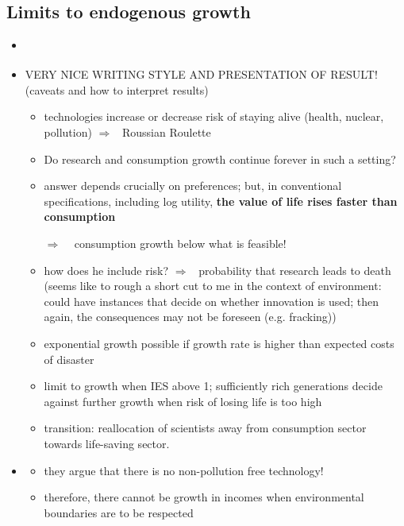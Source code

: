 \documentclass[12pt]{article}
\newcommand{\ar}{$\Rightarrow$ \ }
\begin{document}
\subsection{Limits to endogenous growth}
\begin{itemize}
\item \cite{Stokey1998AreGrowth}
\item \cite{Jones2016LifeGrowth} VERY NICE WRITING STYLE AND PRESENTATION OF RESULT! (caveats and how to interpret results)
\begin{itemize}
\item technologies increase or decrease risk of staying alive (health, nuclear, pollution) \ar Roussian Roulette
\item Do research and consumption growth continue forever in such a setting? 
\item answer depends crucially on preferences; but, in conventional specifications, including log utility, \textbf{the value of life rises faster than consumption}
\item[\ar] consumption growth below what is feasible! 
\item how does he include risk? \ar probability that research leads to death (seems like to rough a short cut to me in the context of environment: could have instances that decide on whether innovation is used; then again, the consequences may not be foreseen (e.g. fracking))
\item exponential growth possible if growth rate is higher than expected costs of disaster
\item limit to growth when IES above 1; sufficiently rich generations decide against further growth when risk of losing life is too high
\item transition: reallocation of scientists away from consumption sector towards life-saving sector. 
\end{itemize}
\item \cite{Brock2005ChapterEmpirics}
\begin{itemize}
\item they argue that there is no non-pollution free technology! 
\item therefore, there cannot be growth in incomes when environmental boundaries are to be respected
\end{itemize}
\end{itemize}
\end{document}
